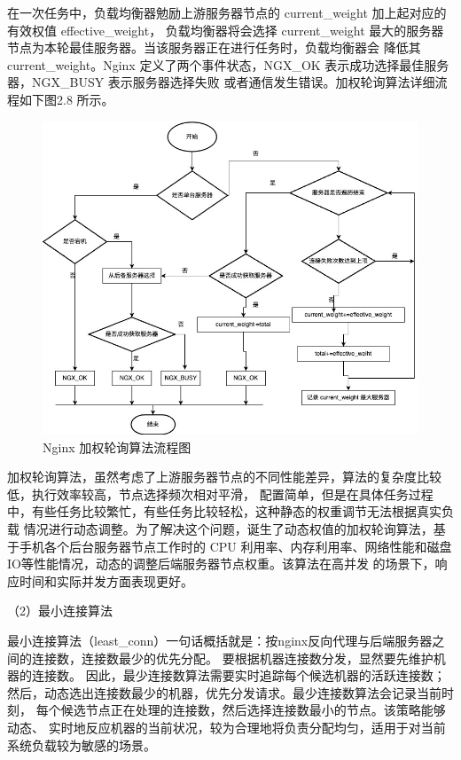 在一次任务中，负载均衡器勉励上游服务器节点的 current\_weight 加上起对应的有效权值 effective\_weight，
负载均衡器将会选择 current\_weight 最大的服务器节点为本轮最佳服务器。当该服务器正在进行任务时，负载均衡器会
降低其 current\_weight。Nginx 定义了两个事件状态，NGX\_OK 表示成功选择最佳服务器，NGX\_BUSY 表示服务器选择失败
或者通信发生错误。加权轮询算法详细流程如下图2.8 所示。

\begin{figure}[htb]
  \centering
  \includegraphics[width=\textwidth]{figures/round-flowchart.jpg}
  \caption{Nginx 加权轮询算法流程图}
\end{figure}

加权轮询算法，虽然考虑了上游服务器节点的不同性能差异，算法的复杂度比较低，执行效率较高，节点选择频次相对平滑，
配置简单，但是在具体任务过程中，有些任务比较繁忙，有些任务比较轻松，这种静态的权重调节无法根据真实负载
情况进行动态调整。为了解决这个问题，诞生了动态权值的加权轮询算法，基于手机各个后台服务器节点工作时的 CPU
利用率、内存利用率、网络性能和磁盘IO等性能情况，动态的调整后端服务器节点权重\cite{谭畅2021云中心基于}。该算法在高并发
的场景下，响应时间和实际并发方面表现更好。

（2）最小连接算法

最小连接算法（least\_conn）一句话概括就是：按nginx反向代理与后端服务器之间的连接数，连接数最少的优先分配\cite{周常志2023基于改进加权最小连接数的微服务负载均衡算法研究}。
要根据机器连接数分发，显然要先维护机器的连接数。
因此，最少连接数算法需要实时追踪每个候选机器的活跃连接数；
然后，动态选出连接数最少的机器，优先分发请求。最少连接数算法会记录当前时刻，
每个候选节点正在处理的连接数，然后选择连接数最小的节点。该策略能够动态、
实时地反应机器的当前状况，较为合理地将负责分配均匀，适用于对当前系统负载较为敏感的场景。

